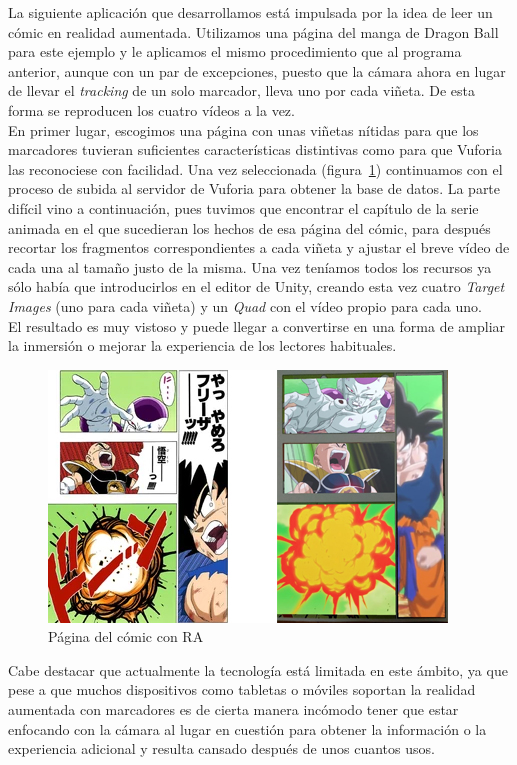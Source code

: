 La siguiente aplicación que desarrollamos está impulsada por la idea de leer un cómic en realidad aumentada. Utilizamos una página del manga de Dragon Ball para este ejemplo y le aplicamos el mismo procedimiento que al programa anterior, aunque con un par de excepciones, puesto que la cámara ahora en lugar de llevar el \textit{tracking} de un solo marcador, lleva uno por cada viñeta. De esta forma se reproducen los cuatro vídeos a la vez.\\

En primer lugar, escogimos una página con unas viñetas nítidas para que los marcadores tuvieran suficientes características distintivas como para que Vuforia las reconociese con facilidad. Una vez seleccionada (figura~\ref{DBZ}) continuamos con el proceso de subida al servidor de Vuforia para obtener la base de datos. La parte difícil vino a continuación, pues tuvimos que encontrar el capítulo de la serie animada en el que sucedieran los hechos de esa página del cómic, para después recortar los fragmentos correspondientes a cada viñeta y ajustar el breve vídeo de cada una al tamaño justo de la misma. Una vez teníamos todos los recursos ya sólo había que introducirlos en el editor de Unity, creando esta vez cuatro \textit{Target Images} (uno para cada viñeta) y un \textit{Quad} con el vídeo propio para cada uno.\\

El resultado es muy vistoso y puede llegar a convertirse en una forma de ampliar la inmersión o mejorar la experiencia de los lectores habituales.

\begin{figure}[H]
    \centering
    \includegraphics[width=0.7\linewidth]{Images/mangaKrillin.jpg}
    \caption{Página del cómic con RA}
    \label{DBZ}
\end{figure}

Cabe destacar que actualmente la tecnología está limitada en este ámbito, ya que pese a que muchos dispositivos como tabletas o móviles soportan la realidad aumentada con marcadores es de cierta manera incómodo tener que estar enfocando con la cámara al lugar en cuestión para obtener la información o la experiencia adicional y resulta cansado después de unos cuantos usos.



